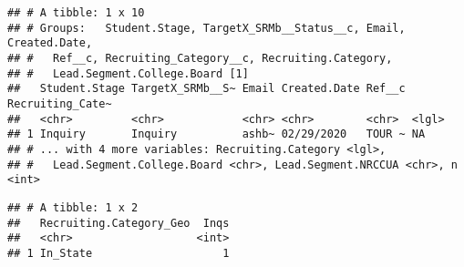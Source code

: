 \documentclass[
]{article}
\newenvironment{Shaded}{\begin{snugshade}}{\end{snugshade}}
\newcommand{\CommentTok}[1]{\textcolor[rgb]{0.56,0.35,0.01}{\textit{#1}}}
\newcommand{\DataTypeTok}[1]{\textcolor[rgb]{0.13,0.29,0.53}{#1}}
\newcommand{\KeywordTok}[1]{\textcolor[rgb]{0.13,0.29,0.53}{\textbf{#1}}}
\newcommand{\NormalTok}[1]{#1}
\newcommand{\OperatorTok}[1]{\textcolor[rgb]{0.81,0.36,0.00}{\textbf{#1}}}
\newcommand{\StringTok}[1]{\textcolor[rgb]{0.31,0.60,0.02}{#1}}
\begin{document}
\begin{Shaded}
\end{Shaded}

\begin{verbatim}
## # A tibble: 1 x 10
## # Groups:   Student.Stage, TargetX_SRMb__Status__c, Email, Created.Date,
## #   Ref__c, Recruiting_Category__c, Recruiting.Category,
## #   Lead.Segment.College.Board [1]
##   Student.Stage TargetX_SRMb__S~ Email Created.Date Ref__c Recruiting_Cate~
##   <chr>         <chr>            <chr> <chr>        <chr>  <lgl>           
## 1 Inquiry       Inquiry          ashb~ 02/29/2020   TOUR ~ NA              
## # ... with 4 more variables: Recruiting.Category <lgl>,
## #   Lead.Segment.College.Board <chr>, Lead.Segment.NRCCUA <chr>, n <int>
\end{verbatim}

\begin{Shaded}
\end{Shaded}

\begin{Shaded}
\end{Shaded}

\begin{verbatim}
## # A tibble: 1 x 2
##   Recruiting.Category_Geo  Inqs
##   <chr>                   <int>
## 1 In_State                    1
\end{verbatim}
\end{document}
